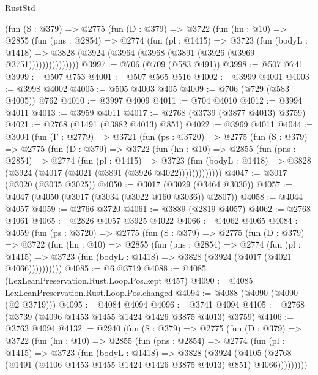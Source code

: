 \begin{lexlean}{RustStd}
\begin{coremodule}
          (fun (S : @379) =>
          @2775
            (fun (D : @379) =>
            @3722
              (fun (hn : @10) =>
              @2855
                (fun (pns : @2854) =>
                @2774
                  (fun (pl : @1415) =>
                  @3723
                    (fun (bodyL : @1418) =>
                    @3828 (@3924 (@3964 (@3968 (@3891 (@3926 (@3969 @3751)))))))))))))))
@3997 := @706 (@709 (@583 @491))
@3998 := @507 @741
@3999 := @507 @753
@4001 := @507 @565 @516
@4002 := @3999 @4001
@4003 := @3998 @4002
@4005 := @505 @4003 @405
@4009 := @706 (@729 (@583 @4005)) @762
@4010 := @3997 @4009
@4011 := @704 @4010
@4012 := @3994 @4011
@4013 := @3959 @4011
@4017 := @2768 (@3739 (@3877 @4013) @3759)
@4021 := @2768 (@1491 (@3882 @4013) @851)
@4022 := @3969 @4011
@4044 := @3004
    (fun (Γ : @2779) =>
    @3721
      (fun (ps : @3720) =>
      @2775
        (fun (S : @379) =>
        @2775
          (fun (D : @379) =>
          @3722
            (fun (hn : @10) =>
            @2855
              (fun (pns : @2854) =>
              @2774
                (fun (pl : @1415) =>
                @3723
                  (fun (bodyL : @1418) =>
                  @3828 (@3924 (@4017 (@4021 (@3891 (@3926 @4022)))))))))))))
@4047 := @3017 (@3020 (@3035 @3025))
@4050 := @3017 (@3029 (@3464 @3030))
@4057 := @4047 (@4050 (@3017 (@3034 (@3022 @160 @3036)) @2807))
@4058 := @4044 @4057
@4059 := @2766 @3720
@4061 := @3889 (@2819 @4057)
@4062 := @2768 @4061
@4065 := @2826 @4057 @3925 @4022
@4066 := @4062 @4065
@4084 := @4059
    (fun (ps : @3720) =>
    @2775
      (fun (S : @379) =>
      @2775
        (fun (D : @379) =>
        @3722
          (fun (hn : @10) =>
          @2855
            (fun (pns : @2854) =>
            @2774
              (fun (pl : @1415) =>
              @3723 (fun (bodyL : @1418) => @3828 (@3924 (@4017 (@4021 @4066))))))))))
@4085 := @6 @3719
@4088 := @4085 (LexLeanPreservation.Rust.Loop.Pos.kept @457)
@4090 := @4085 LexLeanPreservation.Rust.Loop.Pos.changed
@4094 := @4088 (@4090 (@4090 (@2 @3719)))
@4095 := @4084 @4094
@4096 := @3741 @4094
@4105 := @2768 (@3739 (@4096 @1453 @1455 @1424 @1426 @3875 @4013) @3759)
@4106 := @3763 @4094
@4132 := @2940
    (fun (S : @379) =>
    @2775
      (fun (D : @379) =>
      @3722
        (fun (hn : @10) =>
        @2855
          (fun (pns : @2854) =>
          @2774
            (fun (pl : @1415) =>
            @3723
              (fun (bodyL : @1418) =>
              @3828
                (@3924
                  (@4105
                    (@2768 (@1491 (@4106 @1453 @1455 @1424 @1426 @3875 @4013) @851) @4066)))))))))

\end{coremodule}
\end{lexlean}

